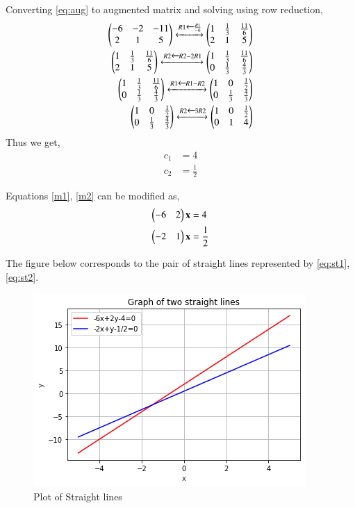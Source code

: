 \documentclass[journal,12pt,twocolumn]{IEEEtran}
\begin{document}
Converting \eqref{eq:aug} to augmented matrix and solving using row reduction, 
\begin{align}
    \begin{pmatrix}-6 & -2 & -11 \\ 2 & 1 & 5\end{pmatrix} \xleftrightarrow[]{R1 \xleftarrow{} \frac{R1}{-6}} \begin{pmatrix}1 & \frac{1}{3} & \frac{11}{6} \\ 2 & 1 & 5\end{pmatrix} \\
    \begin{pmatrix}1 & \frac{1}{3} & \frac{11}{6} \\ 2 & 1 & 5\end{pmatrix}\xleftrightarrow[]{R2 \xleftarrow{} R2-2R1 } \begin{pmatrix}1 & \frac{1}{3} & \frac{11}{6} \\ 0 & \frac{1}{3} & \frac{4}{3}\end{pmatrix} \\ 
    \begin{pmatrix}1 & \frac{1}{3} & \frac{11}{6} \\ 0 & \frac{1}{3} & \frac{4}{3}\end{pmatrix}
    \xleftrightarrow[]{R1 \xleftarrow{} R1-R2} \begin{pmatrix}1 & 0 & \frac{1}{2} \\ 0 & \frac{1}{3} & \frac{4}{3}\end{pmatrix} \\
    \begin{pmatrix}1 & 0 & \frac{1}{2} \\ 0 & \frac{1}{3} & \frac{4}{3}\end{pmatrix}
    \xleftrightarrow[]{R2 \xleftarrow{} 3R2} \begin{pmatrix}1 & 0 & \frac{1}{2} \\ 0 & 1 & 4\end{pmatrix}
\end{align}
Thus we get, 
\begin{align}
    c_1 &= 4\\
    c_2 &= \frac{1}{2}
\end{align}

Equations \eqref{m1}, \eqref{m2} can be modified as, 
\begin{align}
    \begin{pmatrix}-6 & 2\end{pmatrix}\mathbf{x} &= 4  \label{eq:st1}\\
    \begin{pmatrix}-2 & 1\end{pmatrix}\mathbf{x} &= \frac{1}{2} \label{eq:st2}
\end{align}

The figure below corresponds to the pair of straight lines represented by \eqref{eq:st1}, \eqref{eq:st2}. 
\renewcommand{\thefigure}{\arabic{figure}}
\begin{figure}[h!]
	\centering
	\includegraphics[width=\columnwidth]{straightlines.png}
	\caption{Plot of Straight lines}
	\label{fig_1}
\end{figure}
\end{document}

